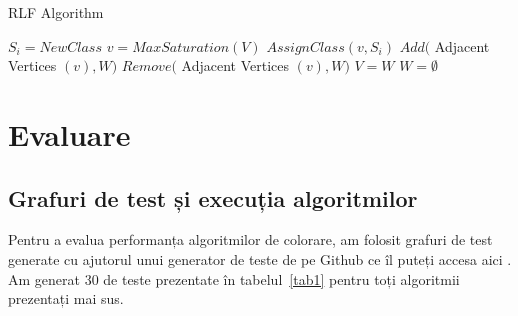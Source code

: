 \documentclass[runningheads]{llncs}
\begin{document}
\begin{algorithm}
\caption{RLF Algorithm}
\label{alg4}
\begin{algorithmic}[1]
\State $S_i = NewClass$
\State $v = MaxSaturation(V)$
\State $AssignClass(v, S_i)$
\State $Add($ Adjacent Vertices $(v), W)$
\State $Remove($ Adjacent Vertices $(v), W)$
\EndWhile
\State $V = W$
\State $W = \emptyset$
\EndWhile
\EndProcedure
\end{algorithmic}
\end{algorithm}


\section{Evaluare}
\subsection{Grafuri de test și execuția algoritmilor}
Pentru a evalua performanța algoritmilor de colorare, am folosit grafuri de test
generate cu ajutorul unui generator de teste de pe Github ce îl puteți accesa aici \cite{16}.
Am generat 30 de teste prezentate în tabelul~\ref{tab1} pentru toți algoritmii
prezentați mai sus.

\pagebreak
\end{document}
